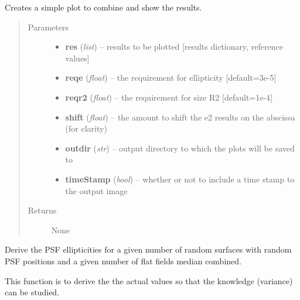\documentclass[a4paper,11pt,english]{sphinxmanual}
\begin{document}
\begin{fulllineitems}
\label{reduction:analysis.FlatfieldCalibration.plotNumberOfFrames}
Creates a simple plot to combine and show the results.
\begin{quote}\begin{description}
\item[{Parameters}] \leavevmode\begin{itemize}
\item {} 
\textbf{res} (\emph{list}) -- results to be plotted {[}results dictionary, reference values{]}

\item {} 
\textbf{reqe} (\emph{float}) -- the requirement for ellipticity {[}default=3e-5{]}

\item {} 
\textbf{reqr2} (\emph{float}) -- the requirement for size R2 {[}default=1e-4{]}

\item {} 
\textbf{shift} (\emph{float}) -- the amount to shift the e2 results on the abscissa (for clarity)

\item {} 
\textbf{outdir} (\emph{str}) -- output directory to which the plots will be saved to

\item {} 
\textbf{timeStamp} (\emph{bool}) -- whether or not to include a time stamp to the output image

\end{itemize}

\item[{Returns}] \leavevmode
None

\end{description}\end{quote}

\end{fulllineitems}


\begin{fulllineitems}
\label{reduction:analysis.FlatfieldCalibration.testFlatCalibration}
Derive the PSF ellipticities for a given number of random surfaces with random PSF positions
and a given number of flat fields median combined.

This function is to derive the the actual values so that the knowledge (variance) can be studied.

\end{fulllineitems}
\end{document}
